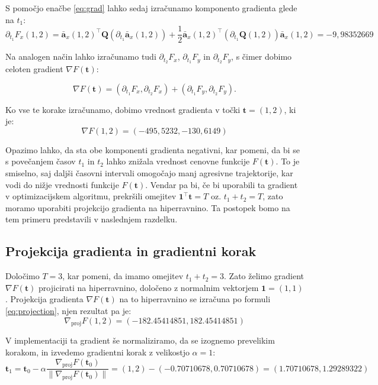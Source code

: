 \documentclass[mat2, tisk]{fmfdelo}
\newcommand{\aimplicit}{\bar{\mathbf{a}}}
\newcommand{\qmat}{\mathbf{Q}}
\newcommand{\tvec}{\mathbf{t}}
\begin{document}
S pomočjo enačbe \eqref{eq:grad} lahko sedaj izračunamo komponento gradienta glede na $t_1$:
\begin{equation}
    \label{eq:grad_t1}
    \partial_{t_1} F_x(1, 2) = \aimplicit_x(1, 2)^\top \qmat (\partial_{t_1} \aimplicit_x(1, 2)) + \frac{1}{2} \aimplicit_x(1, 2)^\top (\partial_{t_1} \qmat(1, 2)) \aimplicit_x(1, 2) = -9,98352669
\end{equation}

Na analogen način lahko izračunamo tudi $\partial_{t_2} F_x$, $\partial_{t_1} F_y$ in $\partial_{t_2} F_y$, s čimer dobimo celoten gradient $\nabla F(\tvec)$:

\begin{equation}
\nabla F(\tvec) = (\partial_{t_1} F_x, \partial_{t_2} F_x) + (\partial_{t_1} F_y, \partial_{t_2} F_y).
\end{equation}

Ko vse te korake izračunamo, dobimo vrednost gradienta v točki $\tvec = (1, 2)$, ki je:
\begin{equation}
\nabla F(1, 2) = (-495,5232, -130,6149)
\end{equation}

Opazimo lahko, da sta obe komponenti gradienta negativni, kar pomeni, da bi se s povečanjem časov $t_1$ in $t_2$ lahko znižala vrednost cenovne funkcije $F(\tvec)$. To je smiselno, saj daljši časovni intervali omogočajo manj agresivne trajektorije, kar vodi do nižje vrednosti funkcije $F(\tvec)$. Vendar pa bi, če bi uporabili ta gradient v optimizacijskem algoritmu, prekršili omejitev $\mathbf{1}^\top \tvec = T$ oz. $t_1 + t_2 = T$, zato moramo uporabiti projekcijo gradienta na hiperravnino. Ta postopek bomo na tem primeru predstavili v naslednjem razdelku.

\subsection{Projekcija gradienta in gradientni korak}

Določimo $T = 3$, kar pomeni, da imamo omejitev $t_1 + t_2 = 3$. Zato želimo gradient $\nabla F(\tvec)$ projicirati na hiperravnino, določeno z normalnim vektorjem $\mathbf{1} = (1, 1)$. Projekcija gradienta $\nabla F(\tvec)$ na to hiperravnino se izračuna po formuli \eqref{eq:projection}, njen rezultat pa je:
\begin{equation}
\nabla_{\text{proj}} F(1, 2) = (-182.45414851, 182.45414851)
\end{equation}

V implementaciji ta gradient še normaliziramo, da se izognemo prevelikim korakom, in izvedemo gradientni korak z velikostjo $\alpha = 1$:
\begin{equation}
    \tvec_1 = \tvec_0 - \alpha \frac{\nabla_{\text{proj}} F(\tvec_0)}{\|\nabla_{\text{proj}} F(\tvec_0)\|} = (1, 2) - (-0.70710678,  0.70710678) = (1.70710678, 1.29289322)
\end{equation}
\end{document}
